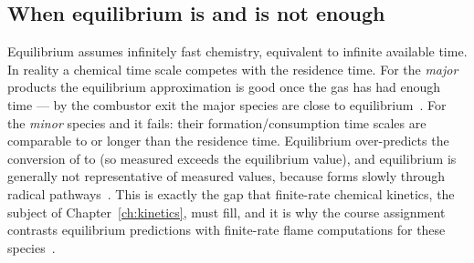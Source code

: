 \subsection{When equilibrium is and is not enough}

Equilibrium assumes infinitely fast chemistry, equivalent to infinite available time. In reality a chemical time scale competes with the residence time. For the \emph{major} products the equilibrium approximation is good once the gas has had enough time --- by the combustor exit the major species are close to equilibrium~\cite{transcript_tutorial}. For the \emph{minor} species  and  it fails: their formation/consumption time scales are comparable to or longer than the residence time. Equilibrium over-predicts the conversion of  to  (so measured  exceeds the equilibrium value), and equilibrium  is generally not representative of measured values, because  forms slowly through radical pathways~\cite{transcript_tutorial}. This is exactly the gap that finite-rate chemical kinetics, the subject of Chapter~\ref{ch:kinetics}, must fill, and it is why the course assignment contrasts equilibrium predictions with finite-rate flame computations for these species~\cite{transcript_tutorial}.
